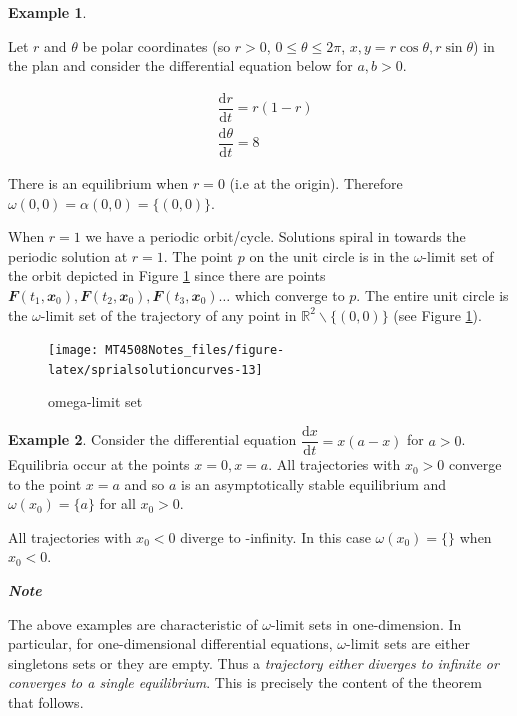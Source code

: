 \documentclass[
  a4paper,
  oneside,
  final]{krantz}
\newcommand{\R}{\mathbb{R}}
\renewcommand{\d}{\mathrm{d}}
\renewcommand{\v}[1]{{\mathbfit{#1}}}
\newcommand{\der}[2]{\dfrac{\d #1}{\d #2}}
\theoremstyle{definition}
\theoremstyle{definition}
\newtheorem{example}{Example}[chapter]
\theoremstyle{definition}
\theoremstyle{definition}
\theoremstyle{remark}
\begin{document}
\begin{example}
\protect\hypertarget{exm:limiting-behaviour-planar}{}\label{exm:limiting-behaviour-planar}

Let \(r\) and \(\theta\) be polar coordinates (so \(r>0\), \(0 \le \theta \le 2\pi\), \(x,y = r \cos \theta, r \sin \theta\)) in the plan and consider the differential equation below for \(a,b >0\).

\begin{align*}
    &\der{r}{t} = r(1-r) \\
    &\der{\theta}{t} = 8
\end{align*}

There is an equilibrium when \(r = 0\) (i.e at the origin). Therefore \(\omega(0,0) = \alpha(0,0) = \{ (0,0)\}\).

When \(r=1\) we have a periodic orbit/cycle. Solutions spiral in towards the periodic solution at \(r =1\). The point \(p\) on the unit circle is in the \(\omega\)-limit set of the orbit depicted in Figure \ref{fig:sprialsolutioncurves} since there are points \(\v{F}(t_1, \v{x_0}), \v{F}(t_2, \v{x_0}), \v{F}(t_3, \v{x_0}) \ldots\) which converge to \(p\). The entire unit circle is the \(\omega\)-limit set of the trajectory of any point in \(\R^{2} \backslash\{(0,0)\}\) (see Figure \ref{fig:sprialsolutioncurves}).

\begin{figure}

{\centering \texttt{[image: MT4508Notes\_files/figure-latex/sprialsolutioncurves-13]} 

}

\caption{omega-limit set}\label{fig:sprialsolutioncurves}
\end{figure}

\end{example}

\begin{example}
Consider the differential equation \(\der{x}{t} = x (a -x)\) for \(a>0\). Equilibria occur at the points \(x=0, x= a\). All trajectories with \(x_{0} >0\) converge to the point \(x =a\) and so \(a\) is an asymptotically stable equilibrium and \(\omega(x_0) = \{a\}\) for all \(x_0 >0\).

All trajectories with \(x_0 <0\) diverge to -infinity. In this case \(\omega(x_0) = \{\}\) when \(x_0 <0\).
\end{example}

\begin{palegreenbox}

\begin{center}
\textbf{\emph{Note}}

\end{center}

The above examples are characteristic of \(\omega\)-limit sets in one-dimension. In particular, for one-dimensional differential equations, \(\omega\)-limit sets are either singletons sets or they are empty. Thus a \emph{trajectory either diverges to infinite or converges to a single equilibrium}. This is precisely the content of the theorem that follows.

\end{palegreenbox}
\end{document}
